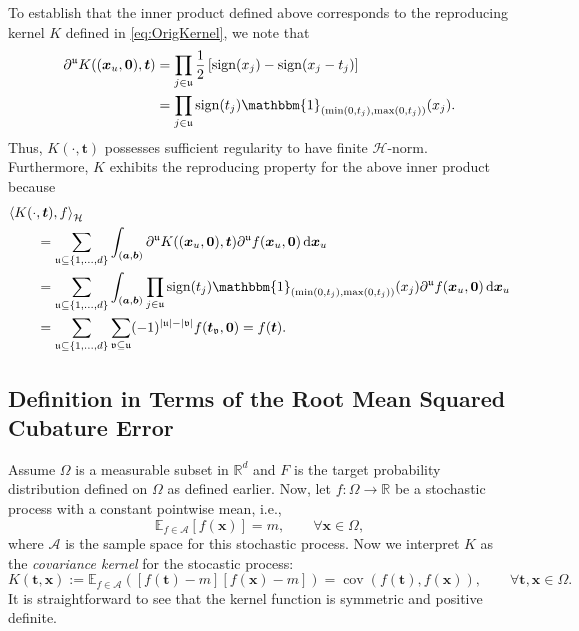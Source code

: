 \documentclass[graybox]{svmult}
\newcommand{\va}{\boldsymbol{a}}
\newcommand{\vb}{\boldsymbol{b}}
\newcommand{\vx}{\boldsymbol{x}}
\newcommand{\vt}{\boldsymbol{t}}
\newcommand{\fraku}{\mathfrak{u}}
\newcommand{\frakv}{\mathfrak{v}}
\newcommand{\dif}{{\rm d}}
\DeclareMathOperator{\sign}{sign}
\newcommand{\ch}{\mathcal{H}}
\newcommand{\bbone}{\mathbbm{1}}
\newcommand{\Ex}{\mathbb{E}}
\DeclareMathOperator{\cov}{cov}
\begin{document}
To establish that the inner product defined above corresponds to the reproducing kernel  $K$ defined in \eqref{eq:OrigKernel}, we note that
\begin{align*}
\partial^{\fraku} K((\vx_u,{\bf 0}),\vt) & =\prod_{j \in \fraku}\frac 12 \left[\sign(x_j) - \sign(x_j - t_j) \right] \\
& =
\prod\limits_{j \in \fraku}\sign(t_j) \bbone_{(\min(0,t_j),\max(0,t_j))}(x_j).
\end{align*}
Thus, $K(\cdot,\vt)$ possesses sufficient regularity to have finite $\ch$-norm.  Furthermore, $K$ exhibits the reproducing property for the above inner product because
\begin{align*}
\MoveEqLeft{\langle K(\cdot,\vt),f \rangle}_{\ch} \\
&= \sum_{\fraku\subseteq \{1,...,d\}}\int_{(\va,\vb)} \partial^{\fraku}K((\vx_u,{\bf 0}),\vt)\partial^{\fraku}f(\vx_u,{\bf 0})  \, \dif \vx_u \\
&= \sum_{\fraku\subseteq \{1,...,d\}}\int_{(\va,\vb)}  \prod\limits_{j \in \fraku}\sign(t_j) \bbone_{(\min(0,t_j),\max(0,t_j))}(x_j) \partial^{\fraku}f(\vx_u,{\bf 0})  \, \dif \vx_u \\
& =     \sum_{\fraku\subseteq \{1,...,d\}}\sum_{\frakv\subseteq \fraku}(-1)^{|\fraku|-|\frakv|}f(\vt_\frakv,{\bf 0})= f(\vt).
\end{align*}


\subsection{Definition in Terms of the Root Mean Squared Cubature Error}
\label{sec:RandomBound}

Assume $\Omega$ is a measurable subset in $\mathbb{R}^d$ and $F$ is the target probability distribution defined on $\Omega$ as defined earlier. 
Now, let $f: \Omega \rightarrow \mathbb{R}$ be a stochastic process with a constant pointwise mean, i.e., 
\[
\Ex_{f\in \mathcal{A}}[f(\vx)]=m, \qquad \forall \vx\in \Omega,
\]
where $\mathcal{A}$ is the sample space for this stochastic process. 
Now we interpret $K$ as the \emph{covariance kernel} for the stocastic process:
\[
K(\vt,\vx):=\Ex_{f\in \mathcal{A}}\left( [f(\vt)-m][f(\vx)-m]\right)=\cov(f(\vt),f(\vx)),\qquad \forall \vt, \vx\in \Omega. 
\]
It is straightforward to see that the kernel function is symmetric and positive definite. 
\end{document}
